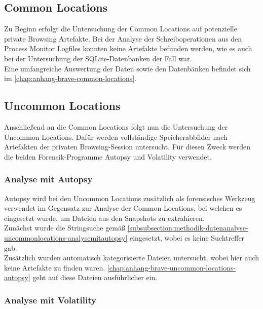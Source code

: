 \subsection*{Common Locations}\label{chap:ergebnisse-brave-common-locations}

Zu Beginn erfolgt die Untersuchung der Common Locations auf potenzielle private Browsing Artefakte. Bei der Analyse der Schreiboperationen aus den Process Monitor Logfiles konnten keine Artefakte befunden werden, wie es auch bei der Untersuchung der SQLite-Datenbanken der Fall war.\\
Eine umfangreiche Auswertung der Daten sowie den Datenbänken befindet sich im \autoref{chap:anhang-brave-common-locations}.

\subsection*{Uncommon Locations}\label{chap:ergebnisse-brave-uncommon-locations}

Anschließend an die Common Locations folgt nun die Untersuchung der Uncommon Locations. Dafür werden vollständige Speicherabbilder nach Artefakten der privaten Browsing-Session untersucht. Für diesen Zweck werden die beiden Forensik-Programme Autopsy und Volatility verwendet.

\subsubsection*{Analyse mit Autopsy}\label{chap:ergebnisse-brave-uncommon-locations-autopsy}

Autopsy wird bei den Uncommon Locations zusätzlich als forensisches Werkzeug verwendet im Gegensatz zur Analyse der Common Locations, bei welchen es eingesetzt wurde, um Dateien aus den Snapshots zu extrahieren.\\
Zunächst wurde die Stringsuche gemäß \autoref{subsubsection:methodik-datenanalyse-uncommonlocations-analysemitautopsy} eingesetzt, wobei es keine Suchtreffer gab.\\
Zusätzlich wurden automatisch kategorisierte Dateien untersucht, wobei hier auch keine Artefakte zu finden waren. \autoref{chap:anhang-brave-uncommon-locations-autopsy} geht auf diese Dateien ausführlicher ein.

\subsubsection*{Analyse mit Volatility}\label{chap:ergebnisse-brave-uncommon-locations-volatility}

